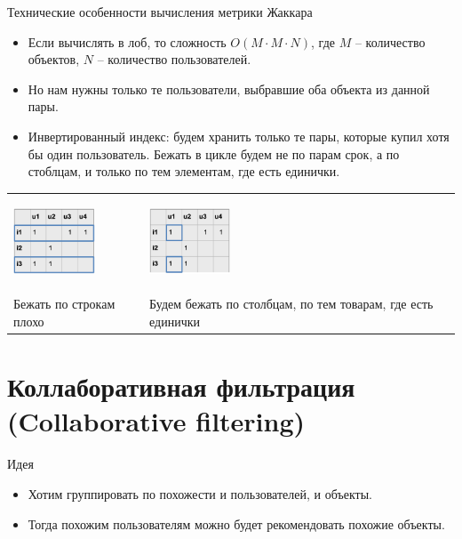 \documentclass[9pt]{beamer}
\begin{document}
\begin{frame}{Технические особенности вычисления метрики Жаккара}
\begin{itemize}
    \item Если вычислять в лоб, то сложность $O(M\cdot M \cdot N)$, где $M$ – количество объектов, $N$ – количество пользователей.
    \item Но нам нужны только те пользователи, выбравшие оба объекта из данной пары.
    \item Инвертированный индекс: будем хранить только те пары, которые купил хотя бы один пользователь. Бежать в цикле будем не по парам срок, а по стоблцам, и только по тем элементам, где есть единички.
\end{itemize}

\begin{center}
\begin{tabular}{p{}p{}}
     \begin{center}\includegraphics[height=75px]{img/jaccard_inv_index_1.png}\end{center}& 
     \begin{center}\includegraphics[height=75px]{img/jaccard_inv_index_2.png}\end{center}\\
     Бежать по строкам плохо & Будем бежать по столбцам, по тем товарам, где есть единички \\
\end{tabular}
\end{center}
\end{frame}

\section{Коллаборативная фильтрация (Collaborative filtering)}
\begin{frame}{Идея}
\begin{itemize}
    \item Хотим группировать по похожести и пользователей, и объекты.
    \item Тогда похожим пользователям можно будет рекомендовать похожие объекты.
\end{itemize}
\end{frame}
\end{document}
